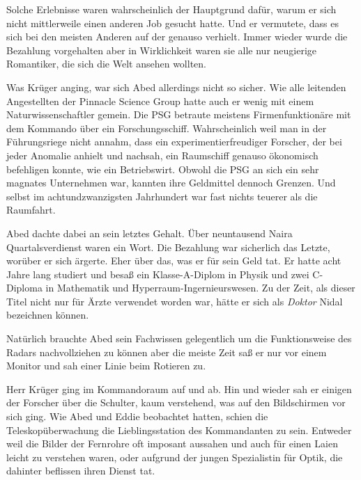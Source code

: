 \par

Solche Erlebnisse waren wahrscheinlich der Hauptgrund dafür, warum er sich nicht mittlerweile einen anderen Job gesucht hatte. Und er vermutete, dass es sich bei den meisten Anderen auf der  genauso verhielt. Immer wieder wurde die Bezahlung vorgehalten aber in Wirklichkeit waren sie alle nur neugierige Romantiker, die sich die Welt ansehen wollten.

\par

Was Krüger anging, war sich Abed allerdings nicht so sicher. Wie alle leitenden Angestellten der Pinnacle Science Group hatte auch er wenig mit einem Naturwissenschaftler gemein. Die PSG betraute meistens Firmenfunktionäre mit dem Kommando über ein Forschungsschiff. Wahrscheinlich weil man in der Führungsriege nicht annahm, dass ein experimentierfreudiger Forscher, der bei jeder Anomalie anhielt und nachsah, ein Raumschiff genauso ökonomisch befehligen konnte, wie ein Betriebswirt. Obwohl die PSG an sich ein sehr magnates Unternehmen war, kannten ihre Geldmittel dennoch Grenzen. Und selbst im achtundzwanzigsten Jahrhundert war fast nichts teuerer als die Raumfahrt.

\par

Abed dachte dabei an sein letztes Gehalt. Über neuntausend Naira Quartalsverdienst waren ein Wort. Die Bezahlung war sicherlich das Letzte, worüber er sich ärgerte. Eher über das, was er für sein Geld tat. Er hatte acht Jahre lang studiert und besaß ein Klasse-A-Diplom in Physik und zwei C-Diploma in Mathematik und Hyperraum-Ingernieurswesen. Zu der Zeit, als dieser Titel nicht nur für Ärzte verwendet worden war, hätte er sich als \textit{Doktor} Nidal bezeichnen können.

\par

Natürlich brauchte Abed sein Fachwissen gelegentlich um die Funktionsweise des Radars nachvollziehen zu können aber die meiste Zeit saß er nur vor einem Monitor und sah einer Linie beim Rotieren zu.

\par

Herr Krüger ging im Kommandoraum auf und ab. Hin und wieder sah er einigen der Forscher über die Schulter, kaum verstehend, was auf den Bildschirmen vor sich ging. Wie Abed und Eddie beobachtet hatten, schien die Teleskopüberwachung die Lieblingsstation des Kommandanten zu sein. Entweder weil die Bilder der Fernrohre oft imposant aussahen und auch für einen Laien leicht zu verstehen waren, oder aufgrund der jungen Spezialistin für Optik, die dahinter beflissen ihren Dienst tat.

